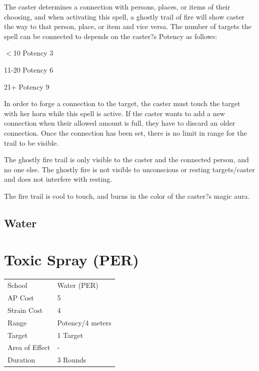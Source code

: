 \documentclass[11pt,a4paper,twocolumn]{book}
\begin{document}
	\medskip
	
	The caster determines a connection with persons, places, or items of their choosing, and when activating this spell, a ghostly trail of fire will show caster the way to that person, place, or item and vice versa. The number of targets the spell can be connected to depends on the caster?s Potency as follows:
	
	\begin{compactitem}
		\item $<$10 Potency 		3
		\item 11-20 Potency 		6
		\item 21+ Potency 			9
	\end{compactitem}
	
	In order to forge a connection to the target, the caster must touch the target with her horn while this spell is active. If the caster wants to add a new connection when their allowed amount is full, they have to discard an older connection. Once the connection has been set, there is no limit in range for the trail to be visible.
	
	The ghostly fire trail is only visible to the caster and the connected person, and no one else. The ghostly fire is not visible to unconscious or resting targets/caster and does not interfere with resting.
	
	The fire trail is cool to touch, and burns in the color of the caster?s magic aura.
	
	
	\subsection*{Water}
	
			\section*{Toxic Spray (PER)}
	{
		\begin{tabu} to 75mm{| X[l,4] | X[l,7] |}
			\hline
			School 			&  Water (PER)			\\
			AP Cost	      	&  5					\\
			Strain Cost     &  4					\\
			Range     		&  Potency/4 meters		\\
			Target      	&  1 Target				\\
			Area of Effect  &  -	 				\\
			Duration     	&  3 Rounds				\\ \hline
		\end{tabu}
		
	}
	
\end{document}
